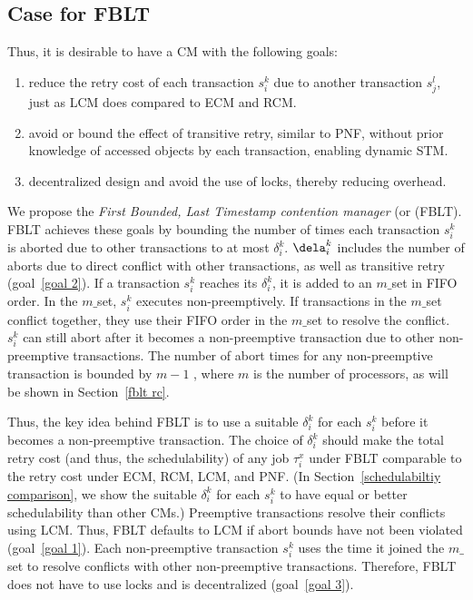 \documentclass[prodmode,acmtecs]{acmsmall}
\begin{document}

\subsection{Case for FBLT}

Thus, it is desirable to have a CM with the following goals:
\begin{enumerate}
\item \label{goal 1} reduce the retry cost of each transaction $s_i^k$ due to another transaction $s_j^l$, just as LCM does compared to ECM and RCM.
\item \label{goal 2} avoid or bound the effect of transitive retry, similar to PNF, without prior knowledge of accessed objects by each transaction, enabling dynamic STM.
\item \label{goal 3} decentralized design and avoid the use of locks, thereby reducing  overhead.
\end{enumerate}

We propose the \textit{First Bounded, Last Timestamp contention manager} (or (FBLT). FBLT achieves these goals by bounding the number of times each transaction $s_i^k$ is aborted due to other transactions to at most $\delta_i^k$. $\dela_i^k$ includes the number of aborts due to direct conflict with other transactions, as well as transitive retry (goal~\ref{goal 2}). If a transaction $s_i^k$ reaches its $\delta_i^k$, it is added to an $m\_$set in FIFO order. In the $m\_$set, $s_i^k$ executes non-preemptively. If transactions in the $m\_$set conflict together, they use their FIFO order in the $m\_$set to resolve the conflict. $s_i^k$ can still abort after it becomes a non-preemptive transaction due to other non-preemptive transactions. The number of abort times 
for any non-preemptive transaction is bounded by $m-1$ , where $m$ is the number of processors, as will be shown in Section~\ref{fblt rc}. 

Thus, the key idea behind FBLT is to use a suitable $\delta_i^k$ for each $s_i^k$ before it becomes a non-preemptive transaction. The choice of $\delta_i^k$ should make the total retry cost (and thus, the schedulability) of any job $\tau_i^x$ under FBLT comparable to the retry cost under ECM, RCM, LCM, and PNF. (In Section~\ref{schedulabiltiy comparison}, we show the suitable $\delta_i^k$ for each $s_i^k$ to have equal or better schedulability than other CMs.) Preemptive transactions resolve their conflicts using LCM.  Thus, FBLT defaults to LCM if abort bounds have not been violated (goal~\ref{goal 1}). Each non-preemptive transaction $s_i^k$  uses the time it joined the $m\_$set to resolve conflicts with other non-preemptive transactions. Therefore, FBLT does not have to use locks and is decentralized (goal~\ref{goal 3}).
\end{document}
